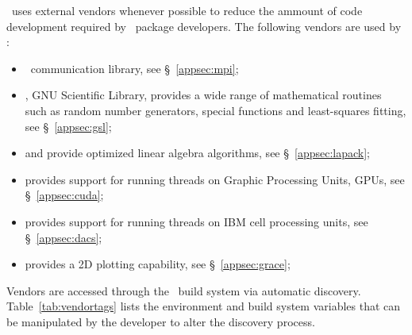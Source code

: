 \draco\ uses external vendors whenever possible to reduce the ammount
of code development required by \draco\ package developers.  The
following vendors are used by \draco:
\begin{itemize}
\item \mpi\ communication library, see \S~\ref{appsec:mpi};
\item {}, GNU Scientific Library, provides a wide range of mathematical routines such as random number generators, special functions and least-squares fitting, see \S~\ref{appsec:gsl};
\item {} and  provide optimized linear algebra algorithms, see \S~\ref{appsec:lapack};
\item {} provides support for running threads on Graphic Processing Units, GPUs, see \S~\ref{appsec:cuda};
\item {} provides support for running threads on IBM cell processing units, see \S~\ref{appsec:dacs};
\item {} provides a 2D plotting capability, see \S~\ref{appsec:grace};
\end{itemize}
Vendors are accessed through the \draco\ build system via automatic discovery.  
Table~\ref{tab:vendortags} lists the environment and build system variables that can be manipulated by the developer to alter the discovery process.
